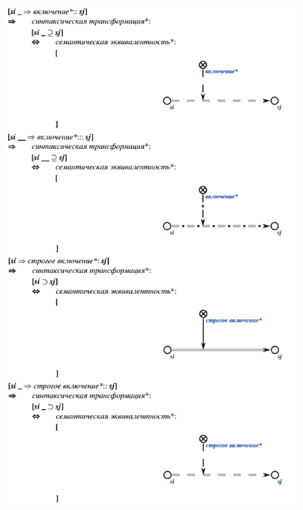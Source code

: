 \newpage

\begin{figure}[h]
	\includegraphics[scale=0.5]{images/intro/scs/sc.s-connectors/examples/example_1.png}
\end{figure}


